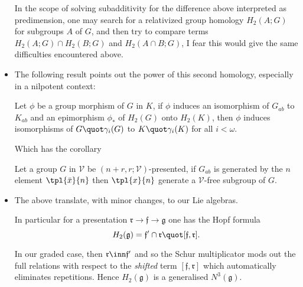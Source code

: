 \documentclass[a4paper,11pt,german,english]{report}
\begin{document}
\begin{itemize}
In the scope of solving subadditivity for the difference above interpreted as predimension,
one may search for a relativized group homology $H_{2}(A;G)$ for subgroups $A$ of $G$,
and then try to compare terms $H_{2}(A;G)\cap H_{2}(B;G)$ and $H_{2}(A\cap B;G)$,
I fear this would give the same difficulties encountered above.

\item[]The following result points out the power of this second homology, especially in a
nilpotent context:
\begin{teo*}
Let $\phi$ be a group morphism of $G$ in $K$, if $\phi$
induces an isomorphism of $G_{ab}$ to $K_{ab}$ and an epimorphism
$\phi_{*}$ of $H_{2}(G)$ onto $H_{2}(K)$, then $\phi$ induces
isomorphisms of $G\quot\gamma_{i}(G)$ to $K\quot\gamma_{i}(K)$ for all
$i<\omega$.
\end{teo*}
Which has the corollary
\begin{teo*}
Let a group $G$ in $\mathcal{V}$ be $(n+r,r;\mathcal{V})$-presented, if $G_{ab}$
is generated by the $n$ element $\tpl{\bar x}{n}$ then $\tpl{x}{n}$ generate a $\mathcal{V}$-free subgroup of $G$.
\end{teo*}

\item[]The above translate, with minor changes, to our
Lie algebras.

In particular for a presentation $\mathfrak{r}\to\mathfrak{f}\to\mathfrak{g}$ one has the
Hopf formula $$H_{2}(\mathfrak{g})=\mathfrak{f}^{\prime}\cap\mathfrak{r}\quot[\mathfrak{f},
\mathfrak{r}].$$

In our graded case, then $\mathfrak{r}\inn\mathfrak{f}^{\prime}$ and
so the Schur multiplicator mods out the full relations with respect to the {\em shifted} term
$[\mathfrak{f},\mathfrak{r}]$ which automatically eliminates repetitions. Hence $H_{2}(\mathfrak{g})$ is a generalised $N^{3}(\mathfrak{g})$.
\end{itemize}
\end{document}

